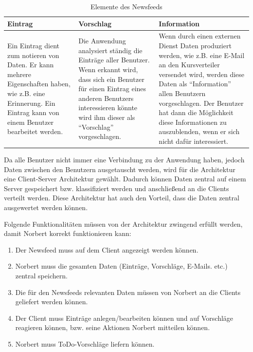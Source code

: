 \begin{table}[H]
    \centering
    \begin{tabularx}{\textwidth}{|X|X|X|}
            \toprule
            \textbf{Eintrag} & \textbf{Vorschlag} & \textbf{Information} \\
            \midrule
            \endhead
            Ein Eintrag dient zum notieren von Daten. Er kann mehrere Eigenschaften haben, wie z.B. eine Erinnerung.
            Ein Eintrag kann von einem Benutzer bearbeitet werden.
            &
            Die Anwendung analysiert ständig die Einträge aller Benutzer. Wenn erkannt wird, dass sich ein Benutzer
            für einen Eintrag eines anderen Benutzers interessieren könnte wird ihm dieser als \enquote{Vorschlag} vorgeschlagen.
            &
            Wenn durch einen externen Dienst Daten produziert werden, wie z.B. eine E-Mail an den Kursverteiler versendet wird,
            werden diese Daten als \enquote{Information} allen Benutzern vorgeschlagen.
            Der Benutzer hat dann die Möglichkeit diese Informationen zu auszublenden, wenn er sich nicht dafür interessiert.
            \\
            \hline
    \end{tabularx}
    \caption{Elemente des Newsfeeds}\label{overview:newsfeedelement}
\end{table}

Da alle Benutzer nicht immer eine Verbindung zu der Anwendung haben, jedoch Daten zwischen den Benutzern ausgetauscht werden, wird für die Architektur eine Client-Server Architektur gewählt.
Dadurch können Daten zentral auf einem Server gespeichert bzw. klassifiziert werden und anschließend an die Clients verteilt werden.
Diese Architektur hat auch den Vorteil, dass die Daten zentral ausgewertet werden können.

Folgende Funktionalitäten müssen von der Architektur zwingend erfüllt werden, damit Norbert korrekt funktionieren kann:
\begin{enumerate}
	\item Der Newsfeed muss auf dem Client angezeigt werden können.
	\item Norbert muss die gesamten Daten (Einträge, Vorschläge, E-Mails. etc.) zentral speichern.
	\item Die für den Newsfeeds relevanten Daten müssen von Norbert an die Clients geliefert werden können.
	\item Der Client muss Einträge anlegen/bearbeiten können und auf Vorschläge reagieren können, bzw. seine Aktionen Norbert mitteilen können.
	\item Norbert muss ToDo-Vorschläge liefern können.
\end{enumerate}


